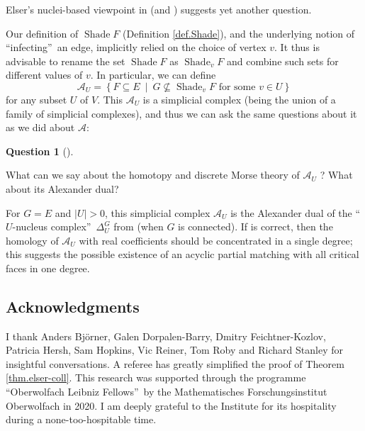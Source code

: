\documentclass[numbers=enddot,12pt,final,onecolumn]{scrartcl}%
\theoremstyle{definition}
\newtheorem{quest}[theo]{Question}
\newenvironment{question}[1][]
{\begin{quest}[#1]\begin{leftbar}}
{\end{leftbar}\end{quest}}
\newenvironment{question}[1][Question]{\noindent\textbf{#1.} }{\ \rule{0.5em}{0.5em}}
\begin{document}
Elser's nuclei-based viewpoint in \cite{Elser84} (and \cite[Conjecture
9.1]{DHLetc19}) suggests yet another question.

Our definition of $\operatorname*{Shade}F$ (Definition \ref{def.Shade}), and
the underlying notion of \textquotedblleft infecting\textquotedblright\ an
edge, implicitly relied on the choice of vertex $v$. It thus is advisable to
rename the set $\operatorname*{Shade}F$ as $\operatorname*{Shade}%
\nolimits_{v}F$ and combine such sets for different values of $v$. In
particular, we can define%
\[
\mathcal{A}_{U}=\left\{  F\subseteq E\ \mid\ G\not \subseteq
\operatorname*{Shade}\nolimits_{v}F\text{ for some }v\in U\right\}
\]
for any subset $U$ of $V$. This $\mathcal{A}_{U}$ is a simplicial complex
(being the union of a family of simplicial complexes), and thus we can ask the
same questions about it as we did about $\mathcal{A}$:

\begin{question}
\label{quest.elser-multi}What can we say about the homotopy and discrete Morse
theory of $\mathcal{A}_{U}$ ? What about its Alexander dual?
\end{question}

For $G=E$ and $\left\vert U\right\vert >0$, this simplicial complex
$\mathcal{A}_{U}$ is the Alexander dual of the \textquotedblleft$U$-nucleus
complex\textquotedblright\ $\Delta_{U}^{G}$ from \cite[Definition
3.2]{DHLetc19} (when $G$ is connected). If \cite[Conjecture 9.1 for
$\left\vert U\right\vert >1$]{DHLetc19} is correct, then the homology of
$\mathcal{A}_{U}$ with real coefficients should be concentrated in a single
degree; this suggests the possible existence of an acyclic partial matching
with all critical faces in one degree.

\subsection*{Acknowledgments}

I thank Anders Bj\"{o}rner, Galen Dorpalen-Barry, Dmitry Feichtner-Kozlov,
Patricia Hersh, Sam Hopkins, Vic Reiner, Tom Roby and Richard Stanley for
insightful conversations. A referee has greatly simplified the proof of
Theorem \ref{thm.elser-coll}. This research was supported through the
programme \textquotedblleft Oberwolfach Leibniz Fellows\textquotedblright\ by
the Mathematisches Forschungsinstitut Oberwolfach in 2020. I am deeply
grateful to the Institute for its hospitality during a none-too-hospitable time.
\end{document}

